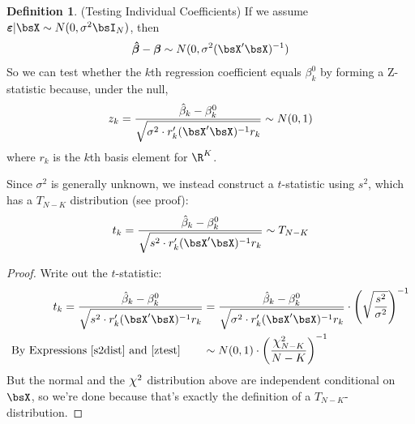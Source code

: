 \documentclass[12pt]{article}
\theoremstyle{plain}
\theoremstyle{definition}
\newtheorem{defn}[thm]{Definition}
\theoremstyle{remark}
\newcommand*{\Chi}{\mbox{\large$\chi$}} %
\newcommand{\bsvarepsilon}{\boldsymbol{\varepsilon}}
\newcommand{\bsbeta}{\boldsymbol{\beta}}
\newcommand{\bshatbeta}{\boldsymbol{\hat{\beta}}}
\begin{document}
\begin{defn}(Testing Individual Coefficients)
If we assume $\bsvarepsilon|\bsX \sim N(0,\sigma^2\bsI_N)$, then
\begin{align*}
  \bshatbeta - \bsbeta
  \sim
  N(0,\sigma^2 (\bsX'\bsX)^{-1})
\end{align*}
So we can test whether the $k$th regression coefficient equals
$\beta_{k}^0$ by forming a Z-statistic because, under the null,
\begin{align}
  z_k = \frac{\hat{\beta}_{k} - \beta_{k}^0}{%
      \sqrt{\sigma^2\cdot r_k'(\bsX'\bsX)^{-1}r_k}}
      \sim N(0,1)
  \label{ztest}
\end{align}
where $r_k$ is the $k$th basis element for $\R^K$.

Since $\sigma^2$ is generally unknown, we instead construct a
$t$-statistic using $s^2$, which has a $T_{N-K}$ distribution (see
proof):
\begin{align*}
  t_k = \frac{\hat{\beta}_{k} - \beta_{k}^0}{%
      \sqrt{s^2 \cdot r_k'(\bsX'\bsX)^{-1}r_k}}
    \sim T_{N-K}
\end{align*}
\end{defn}
\begin{proof}
Write out the $t$-statistic:
\begin{align*}
  t_k =
  \frac{\hat{\beta}_{k} - \beta_{k}^0}{%
      \sqrt{s^2 \cdot r_k'(\bsX'\bsX)^{-1}r_k}}
  &=
  \frac{\hat{\beta}_{k} - \beta_{k}^0}{%
      \sqrt{\sigma^2 \cdot r_k'(\bsX'\bsX)^{-1}r_k}}
  \cdot
  \left(
  \sqrt{%
  \frac{s^2}{\sigma^2}
  }
  \right)^{-1} \\
  \text{By Expressions~\ref{s2dist} and \ref{ztest}}\qquad
  &\sim
  N(0,1)
  \cdot
  \left(
  \frac{\Chi^2_{N-K}}{N-K}
  \right)^{-1}
\end{align*}
But the normal and the $\Chi^2$ distribution above are independent
conditional on $\bsX$, so we're done because that's exactly the
definition of a $T_{N-K}$-distribution.
\end{proof}
\end{document}
